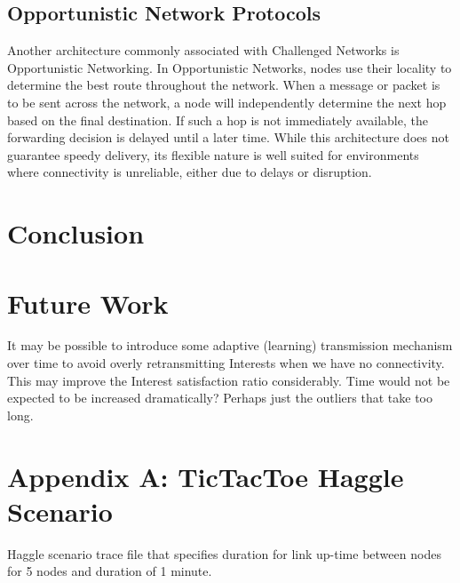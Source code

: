 \documentclass[a4paper,12pt]{report}      %
\begin{document}
\begin{descripton}
\section{Opportunistic Network Protocols}

Another architecture commonly associated with Challenged Networks is Opportunistic Networking. In
Opportunistic Networks, nodes use their locality to determine the best route throughout the network.
When a message or packet is to be sent across the network, a node will independently determine the
next hop based on the final destination. If such a hop is not immediately available, the forwarding
decision is delayed until a later time. While this architecture does not guarantee speedy delivery, its
flexible nature is well suited for environments where connectivity is unreliable, either due to delays or
disruption.\cite{oppnets}

\pagebreak
\chapter{Conclusion}

\pagebreak
\chapter{Future Work}

It may be possible to introduce some adaptive (learning) transmission mechanism over time to avoid
overly retransmitting Interests when we have no connectivity. This may improve the Interest
satisfaction ratio considerably. Time would not be expected to be increased dramatically? Perhaps just
the outliers that take too long.

\pagebreak
{}


\pagebreak
\chapter*{Appendix A: TicTacToe Haggle Scenario}

Haggle scenario trace file that specifies duration for link up-time between nodes for 5 nodes and
duration of 1 minute.


\end{descripton}
\end{document}
